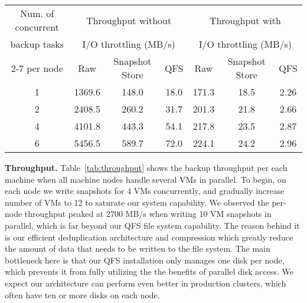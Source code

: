 \begin{table*}[t]
    \centering
    \begin{tabular}{c|ccc|ccc}
    Num. of concurrent      & \multicolumn{3}{c|}{Throughput without}    & \multicolumn{3}{c}{Throughput with} \\
    backup tasks            & \multicolumn{3}{c|}{I/O throttling (MB/s)} & \multicolumn{3}{c}{I/O throttling (MB/s)} \\ \cline{2-7}
    per node                & Raw                                        & Snapshot Store & QFS  & Raw                                    & Snapshot Store & QFS  \\ \hline
    1                       & 1369.6                                     & 148.0          & 18.0 & 171.3                                  & 18.5           & 2.26 \\
    2                       & 2408.5                                     & 260.2          & 31.7 & 201.3                                  & 21.8           & 2.66 \\
    4                       & 4101.8                                     & 443.3          & 54.1 & 217.8                                  & 23.5           & 2.87 \\
    6                       & 5456.5                                     & 589.7          & 72.0 & 224.1                                  & 24.2           & 2.96 \\
    \end{tabular}
\caption{Backup throughput under different concurrency}
\label{tab:throughput}
\end{table*}
{\bf Throughput.}
Table~\ref{tab:throughput} shows the  backup throughput per each machine when all machine nodes 
handle  several VMs in parallel.
To begin, on each node we write snapshots for 4 VMs concurrently, and gradually 
increase number of VMs to 12 to saturate our system capability. We observed 
the per-node throughput peaked at 2700 MB/s when writing 10 VM snapshots in parallel, 
which is far beyond our QFS file system capability. The reason behind it is our efficient
deduplication architecture and compression which greatly reduce the amount of data that needs to be written to
the file system. The main bottleneck here is that our QFS installation only
manages one disk per node, which prevents it from fully utilizing the the
benefits of parallel disk access. We expect our architecture can
perform even better in production clusters, which often have ten or more disks on each node.


